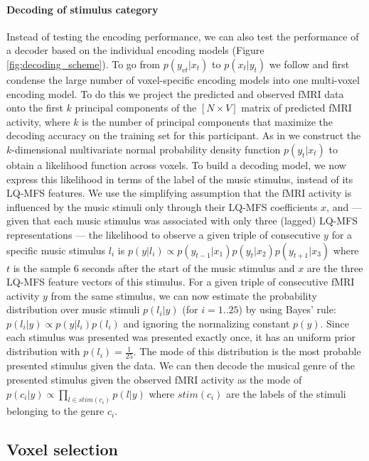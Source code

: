 \paragraph{Decoding of stimulus category}

Instead of testing the encoding performance, we can also test the performance of
a decoder based on the individual encoding models \citet{NG11}
(Figure \ref{fig:decoding_scheme}). To go from
$p(y_{vt}|x_{t})$ to $p(x_{t}|y_{t})$ we follow \citet{NG09} and first condense
the large number of voxel-specific encoding models into one multi-voxel encoding model.
To do this we project the predicted and observed f{MRI} data onto the first $k$
principal components of the $[N\times V]$ matrix of predicted f{MRI} activity, where $k$ is the number of principal components that maximize the decoding
accuracy on the training set for this participant.
As in \citet{NG09} we construct the $k$-dimensional multivariate normal
probability density function $p(y_{t}|x_{t})$ to obtain a likelihood function across voxels.
To build a decoding model, we now express this likelihood in terms of the label
of the music stimulus, instead of its LQ-MFS features.
We use the simplifying assumption that the f{MRI} activity is influenced by the music stimuli only through their LQ-MFS
coefficients $x$, and --- given that each music stimulus was associated with only
three (lagged) LQ-MFS representations --- the likelihood to observe a given
triple of consecutive $y$ for a specific music stimulus $l_{i}$ is $p(y|l_{i}) \propto
p(y_{t-1}|x_{1})p(y_{t}|x_{2})p(y_{t+1}|x_{3})$ where $t$ is the sample 6
seconds after the start of the music stimulus and $x$ are the three LQ-MFS
feature vectors of this stimulus.
For a given triple of consecutive f{MRI} activity $y$ from the same stimulus, we can now estimate the probability distribution over music stimuli
$p(l_{i}|y)$ (for $i=1..25$) by using Bayes' rule: $p(l_{i}|y) \propto
p(y|l_{i})p(l_{i})$ and ignoring the normalizing constant $p(y)$. Since each
stimulus was presented was presented exactly once, it has an uniform prior
distribution with $p(l_{i})=\frac{1}{25}$. The mode of this distribution is the
most probable presented stimulus given the data.
We can then decode the musical genre of the presented stimulus given the observed f{MRI} activity as the mode of $p(c_{i}|y)
\propto \prod\nolimits_{l \in stim(c_{i})} p(l|y)$ where $stim(c_{i})$ are
the labels of the stimuli belonging to the genre $c_{i}$. 

\subsection*{Voxel selection}

